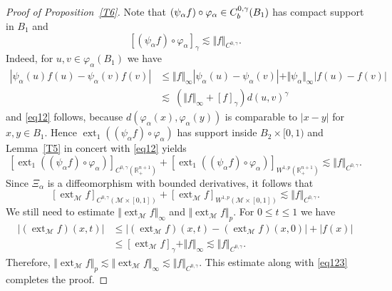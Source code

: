 \documentclass[10pt,a4paper]{amsart}
\def\ext{\operatorname{ext}}
\newcommand{\bbbr}{\mathbb R}
\newcommand{\cM}{\mathcal M}
\begin{document}
\begin{proof}[Proof of Proposition~\ref{T6}]
Note that $(\psi_\alpha f)\circ\varphi_\alpha\in C_{\rm b}^{0,\gamma}(B_1)$ has compact support in $B_1$ and
\begin{equation}
\label{eq12}
[(\psi_\alpha f)\circ\varphi_\alpha]_{\gamma}\lesssim \Vert f\Vert_{C^{0,\gamma}}.
\end{equation}
Indeed, for $u,v\in\varphi_\alpha(B_1)$ we have
\begin{equation*}
\begin{split}
|\psi_\alpha(u)f(u)-\psi_\alpha(v)f(v)|
&\leq
\Vert f\Vert_\infty |\psi_\alpha(u)-\psi_\alpha(v)|+\Vert \psi_\alpha\Vert_\infty|f(u)-f(v)|\\
&\lesssim\
(\Vert f\Vert_\infty+[f]_{\gamma})d(u,v)^\gamma
\end{split}
\end{equation*}
and \eqref{eq12} follows, because $d(\varphi_\alpha(x),\varphi_\alpha(y))$ is comparable to $|x-y|$
for $x,y\in B_1$.
Hence $\ext_1((\psi_\alpha f)\circ\varphi_\alpha)$ has support inside $B_2\times[0,1)$ and Lemma~\ref{T5} in concert with \eqref{eq12} yields
\begin{equation}
\label{eq123}
[\ext_1((\psi_\alpha f)\circ\varphi_\alpha)]_{C^{0,\gamma}(\bbbr^{n+1}_+)}+
[\ext_1((\psi_\alpha f)\circ\varphi_\alpha)]_{W^{1,p}(\bbbr^{n+1}_+)}\lesssim \Vert f\Vert_{C^{0,\gamma}}.
\end{equation}
Since $\Xi_\alpha$  is a diffeomorphism with bounded derivatives, it follows that
$$
[\ext_\cM f]_{C^{0,\gamma}(\cM\times [0,1])} +
[\ext_\cM f]_{W^{1,p}(\cM\times [0,1])}
\lesssim \Vert f\Vert_{C^{0,\gamma}}.
$$
We still need to estimate $\Vert\ext_\cM f\Vert_\infty$ and $\Vert\ext_\cM f\Vert_p$.
For $0\leq t\leq 1$ we have
\[
\begin{split}
|(\ext_\cM f)(x,t)|
&\leq 
|(\ext_\cM f)(x,t)-(\ext_\cM f)(x,0)|+|f(x)|\\
&\leq
[\ext_\cM f]_\gamma+\Vert f\Vert_\infty\lesssim \Vert f\Vert_{C^{0,\gamma}}.
\end{split}
\]
Therefore, $\Vert\ext_\cM f\Vert_p\lesssim\Vert\ext_\cM f\Vert_\infty\lesssim\Vert f\Vert_{C^{0,\gamma}}$.
This estimate along with \eqref{eq123} completes the proof.
\end{proof}
\end{document}
